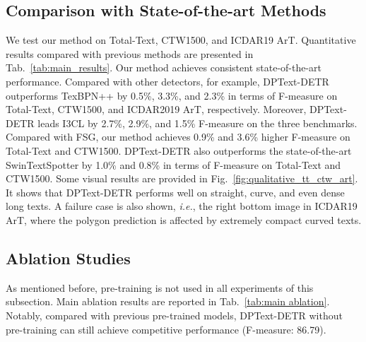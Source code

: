 \documentclass[letterpaper]{article} \usepackage{aaai23}  \usepackage{times}  \usepackage{helvet}  \usepackage{courier}  \usepackage[hyphens]{url}  \usepackage{graphicx} \urlstyle{rm}
\begin{document}
\subsection{Comparison with State-of-the-art Methods}
We test our method on Total-Text, CTW1500, and ICDAR19 ArT. Quantitative results compared with previous methods are presented in Tab.~\ref{tab:main_results}. Our method achieves consistent state-of-the-art performance. Compared with other detectors, for example, DPText-DETR outperforms TexBPN++ by 0.5\%, 3.3\%, and 2.3\% in terms of F-measure on Total-Text, CTW1500, and ICDAR2019 ArT, respectively. Moreover, DPText-DETR leads I3CL by 2.7\%, 2.9\%, and 1.5\% F-measure on the three benchmarks. Compared with FSG, our method achieves 0.9\% and 3.6\% higher F-measure on Total-Text and CTW1500. DPText-DETR also outperforms the state-of-the-art SwinTextSpotter by 1.0\% and 0.8\% in terms of F-measure on Total-Text and CTW1500. 
Some visual results are provided in Fig.~\ref{fig:qualitative_tt_ctw_art}. It shows that DPText-DETR performs well on straight, curve, and even dense long texts. A failure case is also shown, \emph{i.e.}, the right bottom image in ICDAR19 ArT, where the polygon prediction is affected by extremely compact curved texts. 

\subsection{Ablation Studies}
As mentioned before, pre-training is not used in all experiments of this subsection. Main ablation results are reported in Tab.~\ref{tab:main ablation}. Notably, compared with previous pre-trained models, DPText-DETR without pre-training can still achieve competitive performance (F-measure: 86.79).
\end{document}
